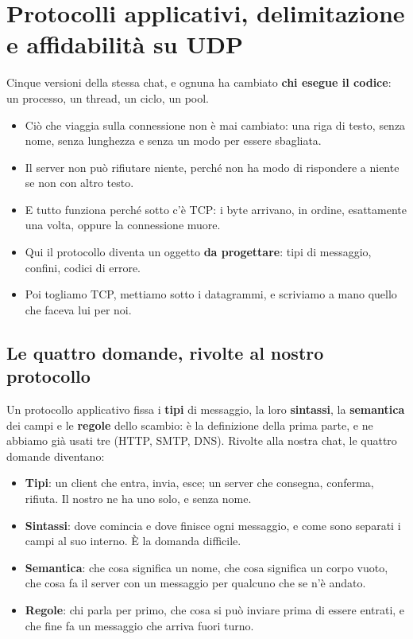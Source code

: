\chapter{Protocolli applicativi, delimitazione e affidabilità su UDP}

Cinque versioni della stessa chat, e ognuna ha cambiato \textbf{chi esegue il codice}: un processo, un thread, un ciclo, un
pool.
\begin{itemize}
    \item Ciò che viaggia sulla connessione non è mai cambiato: una riga di testo, senza nome, senza lunghezza e senza un modo
          per essere sbagliata.
    \item Il server non può rifiutare niente, perché non ha modo di rispondere a niente se non con altro testo.
    \item E tutto funziona perché sotto c'è TCP: i byte arrivano, in ordine, esattamente una volta, oppure la connessione
          muore.
    \item Qui il protocollo diventa un oggetto \textbf{da progettare}: tipi di messaggio, confini, codici di errore.
    \item Poi togliamo TCP, mettiamo sotto i datagrammi, e scriviamo a mano quello che faceva lui per noi.
\end{itemize}

\section{Le quattro domande, rivolte al nostro protocollo}

Un protocollo applicativo fissa i \textbf{tipi} di messaggio, la loro \textbf{sintassi}, la \textbf{semantica} dei campi
e le \textbf{regole} dello scambio: è la definizione della prima parte, e ne abbiamo già usati tre (HTTP, SMTP, DNS).
Rivolte alla nostra chat, le quattro domande diventano:
\begin{itemize}
    \item \textbf{Tipi}: un client che entra, invia, esce; un server che consegna, conferma, rifiuta. Il nostro ne ha uno
          solo, e senza nome.
    \item \textbf{Sintassi}: dove comincia e dove finisce ogni messaggio, e come sono separati i campi al suo interno. È la
          domanda difficile.
    \item \textbf{Semantica}: che cosa significa un nome, che cosa significa un corpo vuoto, che cosa fa il server con un
          messaggio per qualcuno che se n'è andato.
    \item \textbf{Regole}: chi parla per primo, che cosa si può inviare prima di essere entrati, e che fine fa un messaggio
          che arriva fuori turno.
\end{itemize}

